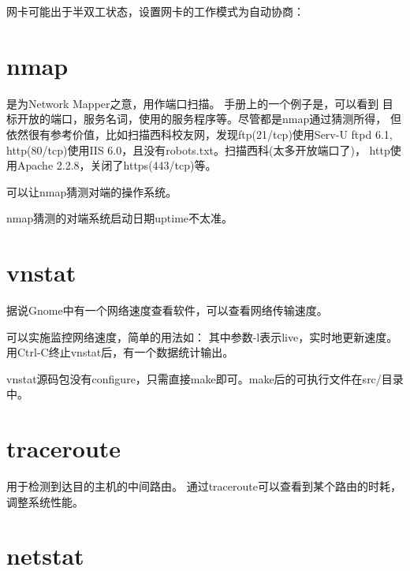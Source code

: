 网卡可能出于半双工状态，设置网卡的工作模式为自动协商：

\section{nmap}
是为Network Mapper之意，用作端口扫描。
手册上的一个例子是，可以看到
目标开放的端口，服务名词，使用的服务程序等。尽管都是nmap通过猜测所得，
但依然很有参考价值，比如扫描西科校友网，发现ftp(21/tcp)使用Serv-U ftpd 6.1,
http(80/tcp)使用IIS 6.0，且没有robots.txt。扫描西科(太多开放端口了)，
http使用Apache 2.2.8，关闭了https(443/tcp)等。

可以让nmap猜测对端的操作系统。

nmap猜测的对端系统启动日期uptime不太准。

\section{vnstat}
据说Gnome中有一个网络速度查看软件，可以查看网络传输速度。

可以实施监控网络速度，简单的用法如：
其中参数-l表示live，实时地更新速度。用Ctrl-C终止vnstat后，有一个数据统计输出。

vnstat源码包没有configure，只需直接make即可。make后的可执行文件在src/目录中。

\section{traceroute}
用于检测到达目的主机的中间路由。
通过traceroute可以查看到某个路由的时耗，调整系统性能。

\section{netstat}

